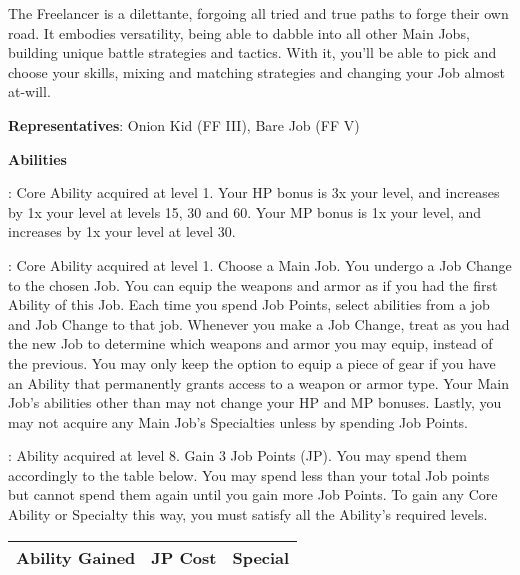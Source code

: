\parbox[c]{0.6\textwidth}{
    The Freelancer is a dilettante, forgoing all tried and true paths to forge their own road. It embodies versatility, being able to dabble into all other Main Jobs, building unique battle strategies and tactics. With it, you’ll be able to pick and choose your skills, mixing and matching strategies and changing your Job almost at-will. \pc

    \textbf{Representatives}: Onion Kid (FF III), Bare Job (FF V) \pc

    \jobstats[hpa=3x,hpb=4x,hpc=5x,hpd=6x,mpa=1x,mpc=2x,armor=?,weapons=?]
}

\begin{ffminipage}
{\centering \textbf{Abilities}\par }

\noindent{}: Core Ability acquired at level 1. Your HP bonus is 3x your level, and increases by 1x your level at levels 15, 30 and 60. Your MP bonus is 1x your level, and increases by 1x your level at level 30.
\end{ffminipage} \pc \begin{ffminipage}
\noindent{}: Core Ability acquired at level 1. Choose a Main Job. You undergo a Job Change to the chosen Job. You can equip the weapons and armor as if you had the first Ability of this Job. Each time you spend Job Points, select abilities from a job and Job Change to that job. Whenever you make a Job Change, treat as you had the new Job to determine which weapons and armor you may equip, instead of the previous. You may only keep the option to equip a piece of gear if you have an Ability that permanently grants access to a weapon or armor type. Your Main Job’s abilities other than  may not change your HP and MP bonuses. Lastly, you may not acquire any Main Job’s Specialties unless by spending Job Points.
\end{ffminipage} \pc \begin{ffminipage}
\noindent{}: Ability acquired at level 8. Gain 3 Job Points (JP). You may spend them accordingly to the table below. You may spend less than your total Job points but cannot spend them again until you gain more Job Points. To gain any Core Ability or Specialty this way, you must satisfy all the Ability's required levels.
\begin{center}
    \begin{tabular}{lcl}
        \toprule
        \textbf{Ability Gained} & \textbf{JP Cost} & \textbf{Special} \\ \midrule

\end{tabular}
\end{center}
\end{ffminipage}
